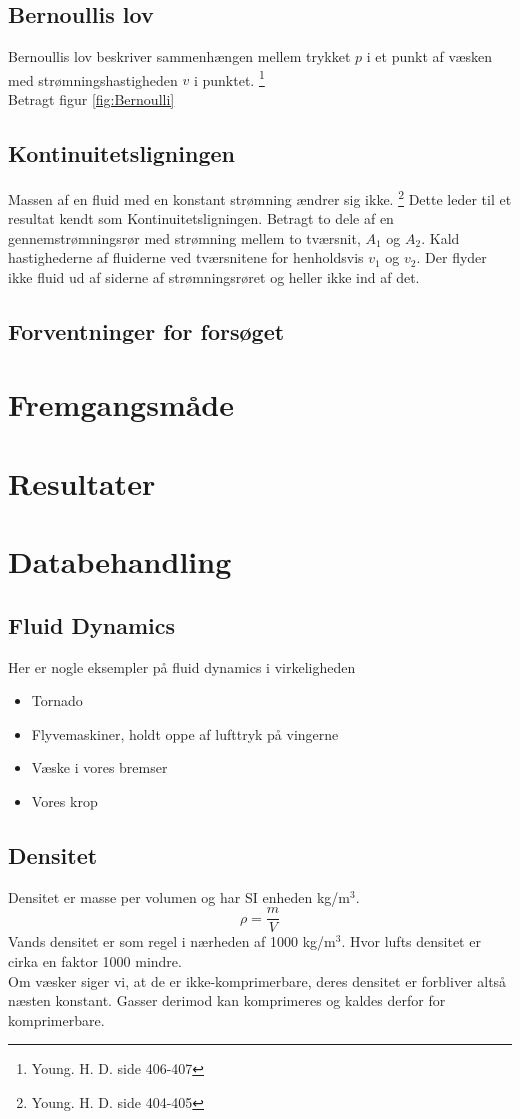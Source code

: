 \documentclass[a4paper, 11pt]{article}
\begin{document}
\subsection{Bernoullis lov}
Bernoullis lov beskriver sammenhængen mellem trykket \(p\) i et punkt af væsken med strømningshastigheden \(v\) i punktet. \footnote{Young. H. D. side 406-407}
\\
Betragt figur \ref{fig:Bernoulli} 
\subsection{Kontinuitetsligningen}
Massen af en fluid med en konstant strømning ændrer sig ikke. \footnote{Young. H. D. side 404-405}
Dette leder til et resultat kendt som Kontinuitetsligningen. Betragt to dele af en gennemstrømningsrør med strømning mellem to tværsnit, \(A_1\) og \(A_2\). Kald hastighederne af fluiderne ved tværsnitene for henholdsvis \(v_1\) og \(v_2\).
Der flyder ikke fluid ud af siderne af strømningsrøret og heller ikke ind af det. 
\subsection{Forventninger for forsøget}
\section{Fremgangsmåde}

\section{Resultater}
\section{Databehandling}
\subsection{Fluid Dynamics}
Her er nogle eksempler på fluid dynamics i virkeligheden
\begin{itemize}
    \item Tornado
    \item Flyvemaskiner, holdt oppe af lufttryk på vingerne
    \item Væske i vores bremser
    \item Vores krop
\end{itemize}
\subsection*{Densitet}
Densitet er masse per volumen og har SI enheden kg/\(\text{m}^3\).
\begin{equation}
    \label{densitet}
    \rho = \frac{m}{V}
\end{equation}
Vands densitet er som regel i nærheden af 1000 kg/\(\text{m}^3\). Hvor lufts densitet er cirka en faktor 1000 mindre.\\
Om væsker siger vi, at de er ikke-komprimerbare, deres densitet er forbliver altså næsten konstant. Gasser derimod kan komprimeres og kaldes derfor for komprimerbare.
\end{document}
